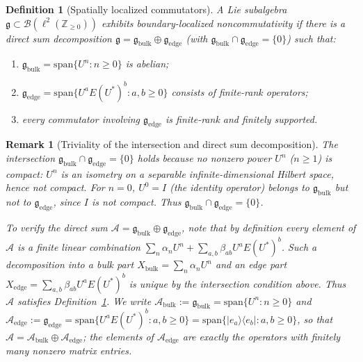 \documentclass[10pt]{amsart}
\newcommand{\1}{{\mathbb{I}}}
\newtheorem{remark}[theorem]{Remark}
\newtheorem{definition}[theorem]{Definition}
\numberwithin{equation}{section}
\begin{document}
\begin{definition}[Spatially localized commutators]\label{def:localized-commutators}
A Lie subalgebra $\mathfrak{g} \subset \mathcal{B}(\ell^2(\mathbb{Z}_{\ge 0}))$ exhibits
\emph{boundary-localized noncommutativity} if there is a direct sum decomposition
$\mathfrak{g} = \mathfrak{g}_{\mathrm{bulk}} \oplus \mathfrak{g}_{\mathrm{edge}}$
(with $\mathfrak{g}_{\mathrm{bulk}} \cap \mathfrak{g}_{\mathrm{edge}} = \{0\}$) such that:
\begin{enumerate}
    \item $\mathfrak{g}_{\mathrm{bulk}} = \mathrm{span}\{U^n : n \ge 0\}$ is abelian;
    \item $\mathfrak{g}_{\mathrm{edge}} = \mathrm{span}\{U^a E (U^*)^b : a,b \ge 0\}$
    consists of finite-rank operators;
    \item every commutator involving $\mathfrak{g}_{\mathrm{edge}}$ is finite-rank and
    finitely supported.
\end{enumerate}
\end{definition}

\begin{remark}[Triviality of the intersection and direct sum decomposition]
The intersection $\mathfrak{g}_{\mathrm{bulk}} \cap \mathfrak{g}_{\mathrm{edge}} = \{0\}$
holds because no nonzero power $U^n$ ($n \ge 1$) is compact: $U^n$ is an isometry on a
separable infinite-dimensional Hilbert space, hence not compact. For $n=0$, $U^0 = I$
(the identity operator) belongs to $\mathfrak{g}_{\mathrm{bulk}}$ but not to
$\mathfrak{g}_{\mathrm{edge}}$, since $I$ is not compact. Thus
$\mathfrak{g}_{\mathrm{bulk}} \cap \mathfrak{g}_{\mathrm{edge}} = \{0\}$.

To verify the direct sum $\mathcal{A} = \mathfrak{g}_{\mathrm{bulk}} \oplus
\mathfrak{g}_{\mathrm{edge}}$, note that by definition every element of $\mathcal{A}$ is a
finite linear combination $\sum_n \alpha_n U^n + \sum_{a,b} \beta_{ab} U^a E (U^*)^b$.
Such a decomposition into a bulk part $X_{\mathrm{bulk}} = \sum_n \alpha_n U^n$ and an edge
part $X_{\mathrm{edge}} = \sum_{a,b} \beta_{ab} U^a E (U^*)^b$ is unique by the
intersection condition above. Thus $\mathcal{A}$ satisfies
Definition~\ref{def:localized-commutators}. We write
$\mathcal{A}_{\mathrm{bulk}} := \mathfrak{g}_{\mathrm{bulk}} = \mathrm{span}\{U^n : n\ge0\}$ and
$\mathcal{A}_{\mathrm{edge}} := \mathfrak{g}_{\mathrm{edge}}
= \mathrm{span}\{U^a E (U^*)^b : a,b\ge0\} = \mathrm{span}\{|e_a\rangle\langle e_b| : a,b\ge0\}$,
so that $\mathcal{A} = \mathcal{A}_{\mathrm{bulk}} \oplus \mathcal{A}_{\mathrm{edge}}$;
the elements of $\mathcal{A}_{\mathrm{edge}}$ are exactly the operators with finitely many
nonzero matrix entries.
\end{remark}
\end{document}
